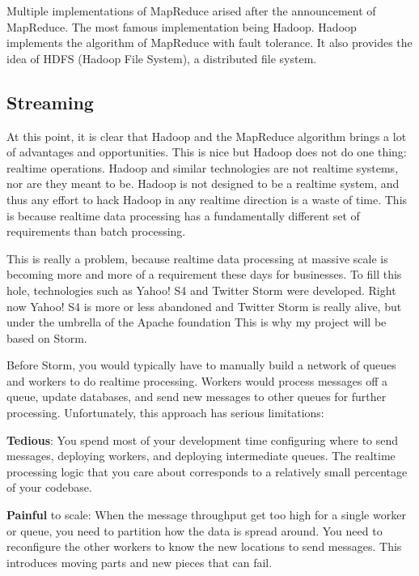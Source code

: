 Multiple implementations of MapReduce arised after the announcement of
MapReduce. The most famous implementation being Hadoop\cite{hadoop}. Hadoop
implements the algorithm of MapReduce with fault tolerance. It also provides
the idea of HDFS (Hadoop File System), a distributed file system.

\subsection{Streaming}

At this point, it is clear that Hadoop and the MapReduce algorithm brings a lot
of advantages and opportunities. This is nice but Hadoop does not do one thing:
realtime operations. Hadoop and similar technologies are not realtime systems,
nor are they meant to be. Hadoop is not designed to be a realtime system, and
thus any effort to hack Hadoop in any realtime direction is a waste of time.
This is because realtime data processing has a fundamentally different set of
requirements than batch processing.

This is really a problem, because realtime data processing at massive scale is
becoming more and more of a requirement these days for businesses. To fill this
hole, technologies such as Yahoo! S4 and Twitter Storm\cite{storm} were
developed. Right now Yahoo! S4 is more or less abandoned and Twitter Storm is
really alive, but under the umbrella of the Apache foundation\cite{apache} This
is why my project will be based on Storm.

Before Storm, you would typically have to manually build a network of queues and
workers to do realtime processing. Workers would process messages off a queue,
update databases, and send new messages to other queues for further processing.
Unfortunately, this approach has serious limitations:

\mylist
\item {\bf Tedious}: You spend most of your development time configuring where to send
messages, deploying workers, and deploying intermediate queues. The realtime
processing logic that you care about corresponds to a relatively small
percentage of your codebase.
\item {\bf Painful} to scale: When the message throughput get too high for a single worker
or queue, you need to partition how the data is spread around. You need to
reconfigure the other workers to know the new locations to send messages. This
introduces moving parts and new pieces that can fail.
\mylistend


